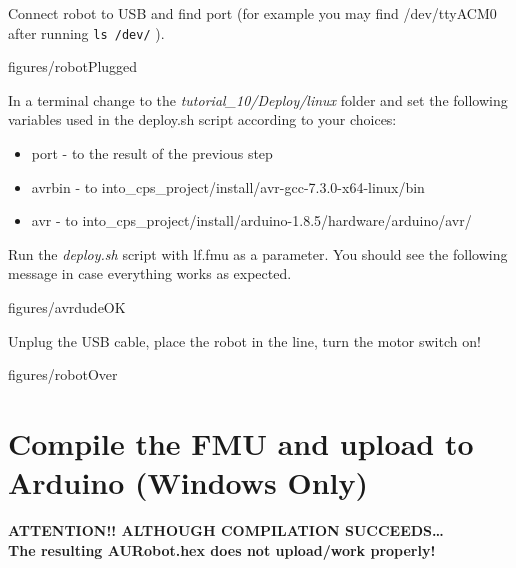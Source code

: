 \documentclass[11pt,a4paper]{../tutorial}
\begin{document}
\begin{instructions} 

\item Connect robot to USB and find port (for example you may find /dev/ttyACM0 after running \verb'ls /dev/' ). 

	
	\begin{annotation}[width=0.85\linewidth,trim={10cm 0 10cm 10cm},clip]{figures/robotPlugged}
	\end{annotation}

\item In a terminal change to the \emph{tutorial\_10/Deploy/linux} folder and set the following variables used in the deploy.sh script according to your choices:
	\begin{itemize}
		\item port - to the result of the previous step
		\item avrbin - to into\_cps\_project/install/avr-gcc-7.3.0-x64-linux/bin 
		\item avr - to into\_cps\_project/install/arduino-1.8.5/hardware/arduino/avr/ 
	\end{itemize}


\item Run the \emph{deploy.sh} script with  lf.fmu as a parameter. You should see the following message in case everything works as expected. 

	\begin{annotation}[width=0.85\linewidth]{figures/avrdudeOK}
	\end{annotation}

\newpage

\item Unplug the USB cable, place the robot in the line, turn the motor switch on!
	
	\begin{annotation}[width=0.85\linewidth,trim={10cm 0 10cm 10cm},clip]{figures/robotOver}
	\end{annotation}
\end{instructions}


\section{Compile the FMU and upload to Arduino (Windows Only)}

\textbf{ATTENTION!! ALTHOUGH COMPILATION SUCCEEDS\ldots \\ The resulting AURobot.hex does not upload/work properly!}
\end{document}
